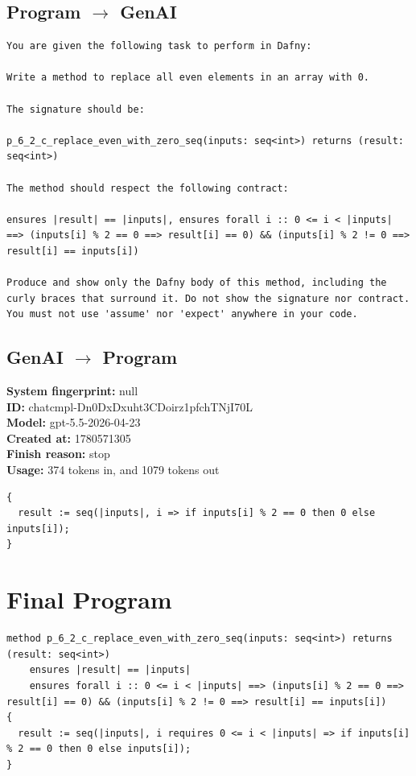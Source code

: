 \documentclass{article}
\begin{document}
\subsection*{Program $\rightarrow$ GenAI}
\begin{lstlisting}
You are given the following task to perform in Dafny:

Write a method to replace all even elements in an array with 0.

The signature should be:

p_6_2_c_replace_even_with_zero_seq(inputs: seq<int>) returns (result: seq<int>)

The method should respect the following contract:

ensures |result| == |inputs|, ensures forall i :: 0 <= i < |inputs| ==> (inputs[i] % 2 == 0 ==> result[i] == 0) && (inputs[i] % 2 != 0 ==> result[i] == inputs[i])

Produce and show only the Dafny body of this method, including the curly braces that surround it. Do not show the signature nor contract. You must not use 'assume' nor 'expect' anywhere in your code.
\end{lstlisting}
\subsection*{GenAI $\rightarrow$ Program}
\textbf{System fingerprint: }null
\\\textbf{ID: }chatcmpl-Dn0DxDxuht3CDoirz1pfchTNjI70L
\\\textbf{Model: }gpt-5.5-2026-04-23
\\\textbf{Created at: }1780571305
\\\textbf{Finish reason: }stop
\\\textbf{Usage: }374 tokens in, and 1079 tokens out
\begin{lstlisting}
{
  result := seq(|inputs|, i => if inputs[i] % 2 == 0 then 0 else inputs[i]);
}
\end{lstlisting}
\section*{Final Program}
\begin{lstlisting}
method p_6_2_c_replace_even_with_zero_seq(inputs: seq<int>) returns (result: seq<int>)
	ensures |result| == |inputs|
	ensures forall i :: 0 <= i < |inputs| ==> (inputs[i] % 2 == 0 ==> result[i] == 0) && (inputs[i] % 2 != 0 ==> result[i] == inputs[i])
{
  result := seq(|inputs|, i requires 0 <= i < |inputs| => if inputs[i] % 2 == 0 then 0 else inputs[i]);
}
\end{lstlisting}
\end{document}
